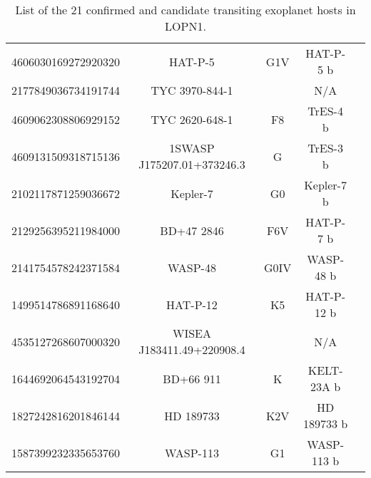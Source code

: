\begin{table}[H]
\begin{minipage}{\textwidth}
\begin{tabular}{c c c c c}
         4606030169272920320 & HAT-P-5  & G1V  & HAT-P-5 b  & \footnotemark[1] \footnotemark[2] \footnotemark[3] \footnotemark[4] \footnotemark[5]  \\
        2177849036734191744  & TYC 3970-844-1 &  & N/A & \footnotemark[1] \footnotemark[2] \footnotemark[4] \footnotemark[5] \\
       4609062308806929152  & TYC 2620-648-1  & F8  & TrES-4 b  & \footnotemark[1] \footnotemark[2] \footnotemark[3] \footnotemark[4] \footnotemark[5] \\
      4609131509318715136  & 1SWASP J175207.01+373246.3 & G & TrES-3 b &  \footnotemark[1] \footnotemark[2] \footnotemark[3] \footnotemark[4] \footnotemark[5] \\
      2102117871259036672  & Kepler-7  & G0  &  Kepler-7 b & \footnotemark[1] \footnotemark[2] \footnotemark[3] \footnotemark[4] \footnotemark[5] \\
      2129256395211984000  & BD+47 2846  & F6V  & HAT-P-7 b  & \footnotemark[1] \footnotemark[2] \footnotemark[3] \footnotemark[4] \footnotemark[5]  \\
      2141754578242371584  & WASP-48  & G0IV  & WASP-48 b  & \footnotemark[1] \footnotemark[2] \footnotemark[3] \footnotemark[4] \footnotemark[5]  \\
      1499514786891168640  & HAT-P-12  & K5 & HAT-P-12 b  & \footnotemark[1] \footnotemark[2] \footnotemark[3] \footnotemark[4] \footnotemark[5] \\
     4535127268607000320   & WISEA J183411.49+220908.4  &   & N/A  & \footnotemark[1] \footnotemark[4]  \footnotemark[6]  \\
      1644692064543192704  & BD+66 911  & K  & KELT-23A b  & \footnotemark[1] \footnotemark[2] \footnotemark[3] \footnotemark[4] \footnotemark[5]  \\
      1827242816201846144  & HD 189733  &  K2V & HD 189733 b  & \footnotemark[1] \footnotemark[2] \footnotemark[3] \footnotemark[4] \footnotemark[5]   \\
     1587399232335653760   &  WASP-113 & G1  & WASP-113 b  & \footnotemark[1] \footnotemark[2] \footnotemark[3] \footnotemark[4] \footnotemark[5]  \\
         \hline 
    \end{tabular}
    \caption{List of the 21 confirmed and candidate transiting exoplanet hosts in LOPN1.\\}
    \label{tab:planet1}
    \end{minipage}
   \end{table}
  \vspace{8mm}

